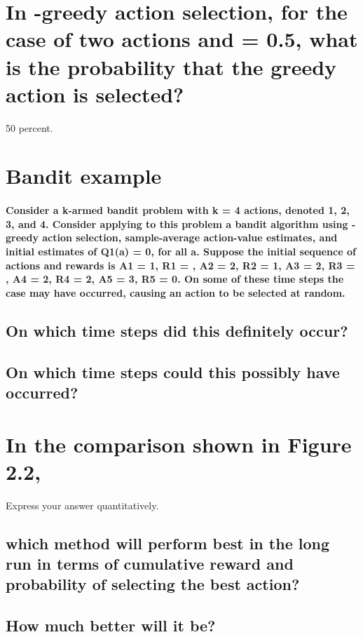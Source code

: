 \documentclass{article}
\begin{document}
\maketitle

\section{In \textepsilon-greedy action selection, for the case of two actions and \textepsilon \thickspace = 0.5, what is the probability that the greedy action is selected?}
50 percent.

\section{Bandit example}
\paragraph{Consider a k-armed bandit problem with k = 4 actions, denoted 1, 2, 3, and 4. Consider applying to this problem a bandit algorithm using \textepsilon-greedy action selection, sample-average action-value estimates, and initial estimates of Q1(a) = 0, for all a. Suppose the initial sequence of actions and rewards is A1 = 1, R1 = , A2 = 2, R2 = 1, A3 = 2, R3 = , A4 = 2, R4 = 2, A5 = 3, R5 = 0. On some of these time steps the \textepsilon \thickspace case may have occurred, causing an action to be selected at random.}
\subsection{On which time steps did this definitely occur?}
\subsection{On which time steps could this possibly have occurred?}

\section{In the comparison shown in Figure 2.2, }
Express your answer quantitatively.
\subsection{which method will perform best in the long run in terms of cumulative reward and probability of selecting the best action?}
\subsection{How much better will it be?}
\end{document}
